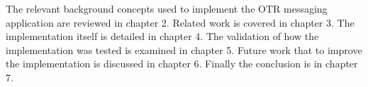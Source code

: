 The relevant background concepts used to implement the OTR messaging application are reviewed in chapter 2. Related work is covered in chapter 3. The implementation itself is detailed in chapter 4. The validation of how the implementation was tested is examined in chapter 5. Future work that to improve the implementation is discussed in chapter 6. Finally the conclusion is in chapter 7.
